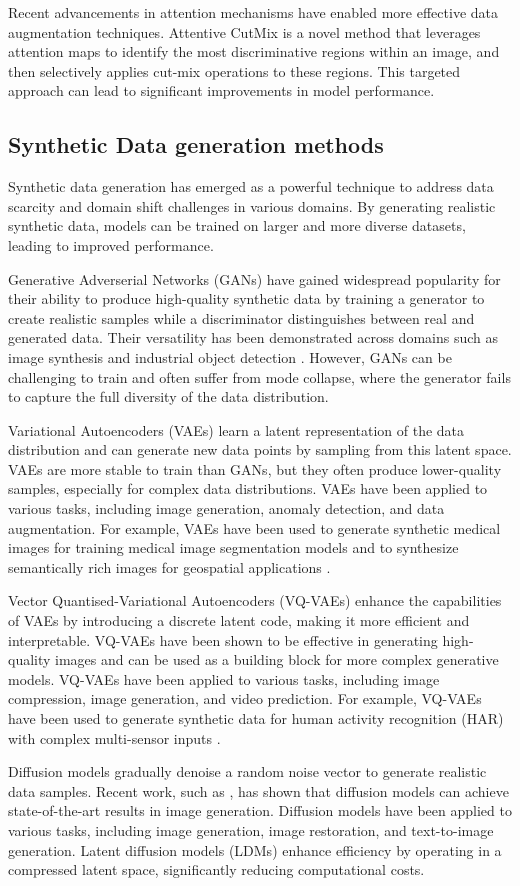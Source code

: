 Recent advancements in attention mechanisms have enabled more effective data augmentation techniques. Attentive CutMix \cite{cut_mix} is a novel method that leverages attention maps to identify the most discriminative regions within an image, and then selectively applies cut-mix operations to these regions. This targeted approach can lead to significant improvements in model performance.

\subsection{Synthetic Data generation methods}
Synthetic data generation has emerged as a powerful technique to address data scarcity and domain shift challenges in various domains. By generating realistic synthetic data, models can be trained on larger and more diverse datasets, leading to improved performance.

Generative Adverserial Networks (GANs) have gained widespread popularity for their ability to produce high-quality synthetic data by training a generator to create realistic samples while a discriminator distinguishes between real and generated data. Their versatility has been demonstrated across domains such as image synthesis \cite{sodgan} and industrial object detection \cite{cyclegan}. However, GANs can be challenging to train and often suffer from mode collapse, where the generator fails to capture the full diversity of the data distribution. 

Variational Autoencoders (VAEs) learn a latent representation of the data distribution and can generate new data points by sampling from this latent space. VAEs are more stable to train than GANs, but they often produce lower-quality samples, especially for complex data distributions. VAEs have been applied to various tasks, including image generation, anomaly detection, and data augmentation. For example, VAEs have been used to generate synthetic medical images for training medical image segmentation models \cite{vae-gan} and to synthesize semantically rich images for geospatial applications \cite{vae-info-cgan}.

Vector Quantised-Variational Autoencoders (VQ-VAEs) enhance the capabilities of VAEs by introducing a discrete latent code, making it more efficient and interpretable. VQ-VAEs have been shown to be effective in generating high-quality images and can be used as a building block for more complex generative models. VQ-VAEs have been applied to various tasks, including image compression, image generation, and video prediction. For example, VQ-VAEs have been used to generate synthetic data for human activity recognition (HAR) with complex multi-sensor inputs \cite{vq-vae}.

Diffusion models gradually denoise a random noise vector to generate realistic data samples. Recent work, such as \cite{ho2020denoising}, has shown that diffusion models can achieve state-of-the-art results in image generation. Diffusion models have been applied to various tasks, including image generation, image restoration, and text-to-image generation. Latent diffusion models (LDMs) \cite{synthesis-diffusion} enhance efficiency by operating in a compressed latent space, significantly reducing computational costs.